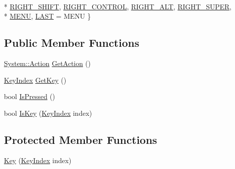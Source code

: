\begin{DoxyCompactItemize}
\\*
\hyperlink{struct_tri_1_1_input_1_1_key_a0b1f54fb1b7be8fe2e920ca8552f86dca032394c4fcdee54490e22efbb22a4f5f}{R\+I\+G\+H\+T\+\_\+\+S\+H\+I\+F\+T}, 
\hyperlink{struct_tri_1_1_input_1_1_key_a0b1f54fb1b7be8fe2e920ca8552f86dca6f37fc608ba167a583d31c756e8bb107}{R\+I\+G\+H\+T\+\_\+\+C\+O\+N\+T\+R\+O\+L}, 
\hyperlink{struct_tri_1_1_input_1_1_key_a0b1f54fb1b7be8fe2e920ca8552f86dcaf37b840ac60dce0be1c990eae1bb9eda}{R\+I\+G\+H\+T\+\_\+\+A\+L\+T}, 
\hyperlink{struct_tri_1_1_input_1_1_key_a0b1f54fb1b7be8fe2e920ca8552f86dca321842ee6c262a9a53f2110d554dab08}{R\+I\+G\+H\+T\+\_\+\+S\+U\+P\+E\+R}, 
\\*
\hyperlink{struct_tri_1_1_input_1_1_key_a0b1f54fb1b7be8fe2e920ca8552f86dca65441516d40860617d323c4e7b6ec02e}{M\+E\+N\+U}, 
\hyperlink{struct_tri_1_1_input_1_1_key_a0b1f54fb1b7be8fe2e920ca8552f86dcac355bc1545ddb8a555c1c19f7dc3ddec}{L\+A\+S\+T} = M\+E\+N\+U
 \}
\end{DoxyCompactItemize}
\subsection*{Public Member Functions}
\begin{DoxyCompactItemize}
\item 
\hyperlink{namespace_tri_1_1_input_1_1_system_a79600e9f4ed835251eed1706ce96bed0}{System\+::\+Action} \hyperlink{struct_tri_1_1_input_1_1_key_aab0d0353660113e5c32ebaf784378610}{Get\+Action} ()
\item 
\hyperlink{struct_tri_1_1_input_1_1_key_a0b1f54fb1b7be8fe2e920ca8552f86dc}{Key\+Index} \hyperlink{struct_tri_1_1_input_1_1_key_a3b4f39428b275aefb07f0f63421fdb84}{Get\+Key} ()
\item 
bool \hyperlink{struct_tri_1_1_input_1_1_key_a5729e09cefd10667decab7dae4130c10}{Is\+Pressed} ()
\item 
bool \hyperlink{struct_tri_1_1_input_1_1_key_a750cdcbd3177f25b8845b1142e590952}{Is\+Key} (\hyperlink{struct_tri_1_1_input_1_1_key_a0b1f54fb1b7be8fe2e920ca8552f86dc}{Key\+Index} index)
\end{DoxyCompactItemize}
\subsection*{Protected Member Functions}
\begin{DoxyCompactItemize}
\item 
\hyperlink{struct_tri_1_1_input_1_1_key_aa813871e191ce89ca9693207c3f9f063}{Key} (\hyperlink{struct_tri_1_1_input_1_1_key_a0b1f54fb1b7be8fe2e920ca8552f86dc}{Key\+Index} index)
\end{DoxyCompactItemize}
